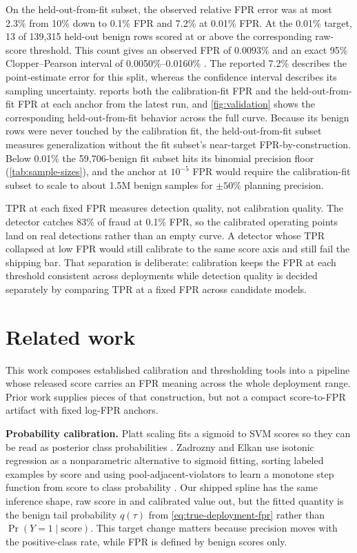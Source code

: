 \documentclass{article}
\begin{document}
On the held-out-from-fit subset, the observed relative FPR error was at most 2.3\% from 10\% down to 0.1\% FPR and 7.2\% at 0.01\% FPR.
At the 0.01\% target, 13 of 139{,}315 held-out benign rows scored at or above the corresponding raw-score threshold.
This count gives an observed FPR of 0.0093\% and an exact 95\% Clopper--Pearson interval of 0.0050\%--0.0160\% \citep{clopper1934}.
The reported 7.2\% describes the point-estimate error for this split, whereas the confidence interval describes its sampling uncertainty.
 reports both the calibration-fit FPR and the held-out-from-fit FPR at each anchor from the latest run, and \cref{fig:validation} shows the corresponding held-out-from-fit behavior across the full curve.
Because its benign rows were never touched by the calibration fit, the held-out-from-fit subset measures generalization without the fit subset's near-target FPR-by-construction.
Below 0.01\% the 59{,}706-benign fit subset hits its binomial precision floor (\cref{tab:sample-sizes}), and the anchor at $10^{-5}$ FPR would require the calibration-fit subset to scale to about 1.5M benign samples for $\pm 50\%$ planning precision.

TPR at each fixed FPR measures detection quality, not calibration quality.
The detector catches 83\% of fraud at 0.1\% FPR, so the calibrated operating points land on real detections rather than an empty curve.
A detector whose TPR collapsed at low FPR would still calibrate to the same score axis and still fail the shipping bar.
That separation is deliberate: calibration keeps the FPR at each threshold consistent across deployments while detection quality is decided separately by comparing TPR at a fixed FPR across candidate models.

\section{Related work}
\label{sec:related-work}

This work composes established calibration and thresholding tools into a pipeline whose released score carries an FPR meaning across the whole deployment range.
Prior work supplies pieces of that construction, but not a compact score-to-FPR artifact with fixed log-FPR anchors.

\textbf{Probability calibration.}
Platt scaling fits a sigmoid to SVM scores so they can be read as posterior class probabilities \citep{platt2000}.
Zadrozny and Elkan use isotonic regression as a nonparametric alternative to sigmoid fitting, sorting labeled examples by score and using pool-adjacent-violators to learn a monotone step function from score to class probability \citep{zadrozny2002}.
Our shipped spline has the same inference shape, raw score in and calibrated value out, but the fitted quantity is the benign tail probability $q(\tau)$ from \cref{eq:true-deployment-fpr} rather than $\Pr(Y=1 \mid \mathrm{score})$.
This target change matters because precision moves with the positive-class rate, while FPR is defined by benign scores only.
\end{document}
